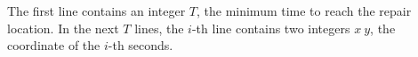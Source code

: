 The first line contains an integer $T$, the minimum time to reach the repair location.
In the next $T$ lines, the $i$-th line contains two integers $x\ y$, the coordinate of the $i$-th seconds.
